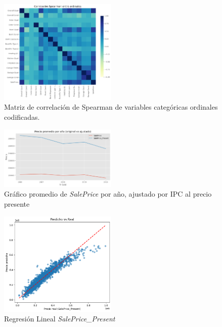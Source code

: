 \begin{figure}[ht]
	\begin{center}
	\includegraphics[width=0.5\textwidth]{figures/Correlación Spearman entre ordinales.png}
	\caption[Matriz de correlación de  Spearman de variables categóricas ordinales codificadas]{Matriz de correlación de Spearman de variables categóricas ordinales codificadas.}
	\label{fig:spearman categórica ordinal}
	\end{center}
\end{figure}

\begin{figure}[ht]
	\begin{center}
	\includegraphics[width=0.5\textwidth]{figures/Ajuste IPC.png}
	\caption[Precio original vs ajustado]{Gráfico promedio de \textit{SalePrice} por año, ajustado por IPC al precio presente}
	\label{fig:Preciooriginalvsajustado}
	\end{center}
\end{figure}

\begin{figure}[ht]
	\begin{center}
	\includegraphics[width=0.5\textwidth]{figures/Regresion Normal.png}
	\caption[Regresión Lineal \textit{SalePrice\_Present}]{Regresión Lineal \textit{SalePrice\_Present}}
	\label{fig:regresioninicial}
	\end{center}
\end{figure}

